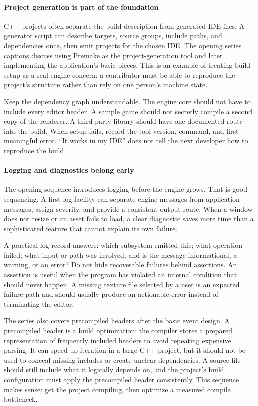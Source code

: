 \paragraph{Project generation is part of the foundation}\label{project-generation-is-part-of-the-foundation}

C++ projects often separate the build description from generated IDE files. A generator script can describe targets, source groups, include paths, and dependencies once, then emit projects for the chosen IDE. The opening series captions discuss using Premake as the project-generation tool and later implementing the application's basic pieces. This is an example of treating build setup as a real engine concern: a contributor must be able to reproduce the project's structure rather than rely on one person's machine state.

Keep the dependency graph understandable. The engine core should not have to include every editor header. A sample game should not secretly compile a second copy of the renderer. A third-party library should have one documented route into the build. When setup fails, record the tool version, command, and first meaningful error. ``It works in my IDE'' does not tell the next developer how to reproduce the build.

\paragraph{Logging and diagnostics belong early}\label{logging-and-diagnostics-belong-early}

The opening sequence introduces logging before the engine grows. That is good sequencing. A first log facility can separate engine messages from application messages, assign severity, and provide a consistent output route. When a window does not resize or an asset fails to load, a clear diagnostic saves more time than a sophisticated feature that cannot explain its own failure.

A practical log record answers: which subsystem emitted this; what operation failed; what input or path was involved; and is the message informational, a warning, or an error? Do not hide recoverable failures behind assertions. An assertion is useful when the program has violated an internal condition that should never happen. A missing texture file selected by a user is an expected failure path and should usually produce an actionable error instead of terminating the editor.

The series also covers precompiled headers after the basic event design. A precompiled header is a build optimization: the compiler stores a prepared representation of frequently included headers to avoid repeating expensive parsing. It can speed up iteration in a large C++ project, but it should not be used to conceal missing includes or create unclear dependencies. A source file should still include what it logically depends on, and the project's build configuration must apply the precompiled header consistently. This sequence makes sense: get the project compiling, then optimize a measured compile bottleneck.

